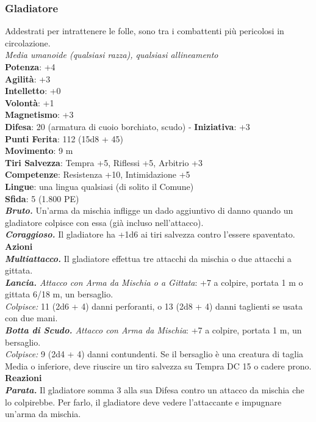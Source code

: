 \begin{multicols}{2}
\subsubsection{Gladiatore}
Addestrati per intrattenere le folle, sono tra i combattenti più pericolosi in circolazione.\\
\emph{Media umanoide (qualsiasi razza), qualsiasi allineamento}\\
\textbf{Potenza}: +4\\
\textbf{Agilità}: +3\\
\textbf{Intelletto}: +0\\
\textbf{Volontà}: +1\\
\textbf{Magnetismo}: +3\\
\textbf{Difesa}: 20 (armatura di cuoio borchiato, scudo) - \textbf{Iniziativa}: +3\\
\textbf{Punti Ferita}: 112 (15d8 + 45)\\
\textbf{Movimento}: 9 m\\
\textbf{Tiri Salvezza}: Tempra +5, Riflessi +5, Arbitrio +3 \\
\textbf{Competenze}: Resistenza +10, Intimidazione +5\\
\textbf{Lingue}: una lingua qualsiasi (di solito il Comune)\\
\textbf{Sfida}: 5 (1.800 PE)\smallskip\\
\emph{\textbf{Bruto.}} Un'arma da mischia infligge un dado aggiuntivo di danno quando un gladiatore colpisce con essa (già incluso nell'attacco).\\
\emph{\textbf{Coraggioso.}} Il gladiatore ha +1d6 ai tiri salvezza contro l'essere spaventato.\\
\smallskip\textbf{Azioni}\\
\emph{\textbf{Multiattacco.}} Il gladiatore effettua tre attacchi da mischia o due attacchi a gittata.\\
\emph{\textbf{Lancia.} Attacco con Arma da Mischia o a Gittata}: +7 a colpire, portata 1 m o gittata 6/18 m, un bersaglio.\\
\emph{Colpisce:} 11 (2d6 + 4) danni perforanti, o 13 (2d8 + 4) danni taglienti se usata con due mani.\\
\emph{\textbf{Botta di Scudo.} Attacco con Arma da Mischia}: +7 a colpire, portata 1 m, un bersaglio.\\
\emph{Colpisce:} 9 (2d4 + 4) danni contundenti. Se il bersaglio è una creatura di taglia Media o inferiore, deve riuscire un tiro salvezza su Tempra DC 15 o cadere prono.\\
\textbf{Reazioni}\\
\emph{\textbf{Parata.}} Il gladiatore somma 3 alla sua Difesa contro un attacco da mischia che lo colpirebbe. Per farlo, il gladiatore deve vedere l'attaccante e impugnare un'arma da mischia.\\


\end{multicols}
